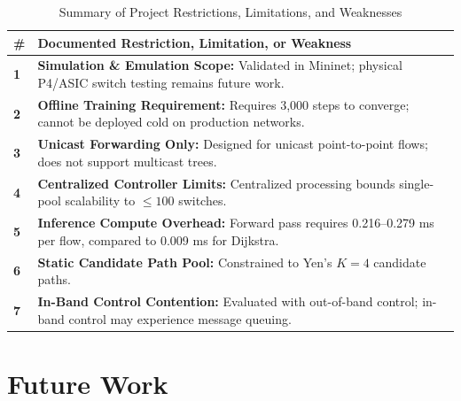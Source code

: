 \documentclass[12pt,a4paper,oneside]{report}
\begin{document}
\begin{table}[htbp]
\centering
\caption{Summary of Project Restrictions, Limitations, and Weaknesses}
\label{tab:limitations}
\small
\begin{tabularx}{\textwidth}{l X}
\toprule
\textbf{\#} & \textbf{Documented Restriction, Limitation, or Weakness} \\
\midrule
\textbf{1} & \textbf{Simulation \& Emulation Scope:} Validated in Mininet; physical P4/ASIC switch testing remains future work. \\
\textbf{2} & \textbf{Offline Training Requirement:} Requires 3,000 steps to converge; cannot be deployed cold on production networks. \\
\textbf{3} & \textbf{Unicast Forwarding Only:} Designed for unicast point-to-point flows; does not support multicast trees. \\
\textbf{4} & \textbf{Centralized Controller Limits:} Centralized processing bounds single-pool scalability to $\le 100$ switches. \\
\textbf{5} & \textbf{Inference Compute Overhead:} Forward pass requires 0.216--0.279 ms per flow, compared to 0.009 ms for Dijkstra. \\
\textbf{6} & \textbf{Static Candidate Path Pool:} Constrained to Yen's $K = 4$ candidate paths. \\
\textbf{7} & \textbf{In-Band Control Contention:} Evaluated with out-of-band control; in-band control may experience message queuing. \\
\bottomrule
\end{tabularx}
\end{table}

\clearpage

\chapter{Future Work}
\label{chap:future}
\end{document}
